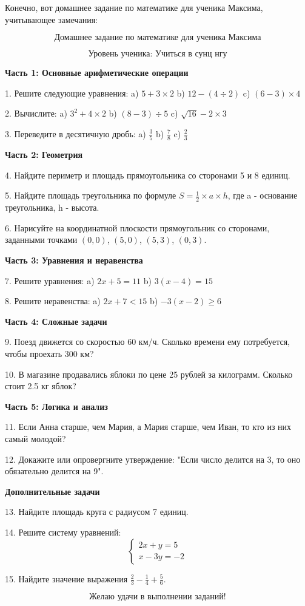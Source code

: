 \documentclass{article}
\begin{document}
Конечно, вот домашнее задание по математике для ученика Максима, учитывающее замечания:

\[
\text{Домашнее задание по математике для ученика Максима}
\]

\[
\text{Уровень ученика: Учиться в сунц нгу}
\]

\textbf{Часть 1: Основные арифметические операции}

1. Решите следующие уравнения:
   a) \(5 + 3 \times 2\)
   b) \(12 - (4 \div 2)\)
   c) \((6 - 3) \times 4\)

2. Вычислите:
   a) \(3^2 + 4 \times 2\)
   b) \((8 - 3) \div 5\)
   c) \(\sqrt{16} - 2 \times 3\)

3. Переведите в десятичную дробь:
   a) \( \frac{3}{5} \)
   b) \( \frac{7}{8} \)
   c) \( \frac{2}{3} \)

\textbf{Часть 2: Геометрия}

4. Найдите периметр и площадь прямоугольника со сторонами 5 и 8 единиц.

5. Найдите площадь треугольника по формуле \(S = \frac{1}{2} \times a \times h\), где a - основание треугольника, h - высота.

6. Нарисуйте на координатной плоскости прямоугольник со сторонами, заданными точками \((0,0)\), \((5,0)\), \((5,3)\), \((0,3)\).

\textbf{Часть 3: Уравнения и неравенства}

7. Решите уравнения:
   a) \(2x + 5 = 11\)
   b) \(3(x - 4) = 15\)

8. Решите неравенства:
   a) \(2x + 7 < 15\)
   b) \(-3(x - 2) \geq 6\)

\textbf{Часть 4: Сложные задачи}

9. Поезд движется со скоростью 60 км/ч. Сколько времени ему потребуется, чтобы проехать 300 км?

10. В магазине продавались яблоки по цене 25 рублей за килограмм. Сколько стоит 2.5 кг яблок?

\textbf{Часть 5: Логика и анализ}

11. Если Анна старше, чем Мария, а Мария старше, чем Иван, то кто из них самый молодой?

12. Докажите или опровергните утверждение: "Если число делится на 3, то оно обязательно делится на 9".

\textbf{Дополнительные задачи}

13. Найдите площадь круга с радиусом 7 единиц.

14. Решите систему уравнений:
\[
\begin{cases}
2x + y = 5 \\
x - 3y = -2
\end{cases}
\]

15. Найдите значение выражения \(\frac{2}{3} - \frac{1}{4} + \frac{5}{6}\).

\[
\text{Желаю удачи в выполнении заданий!}
\]
\end{document}
